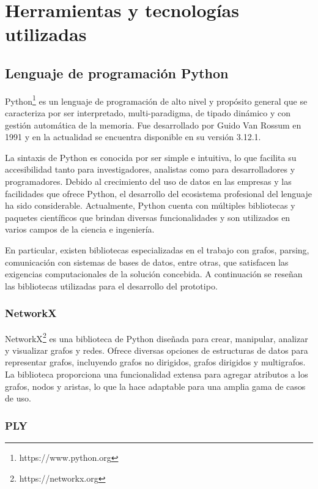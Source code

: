 \section{Herramientas y tecnologías utilizadas}\label{section:tools}

\subsection{Lenguaje de programación Python}

Python\footnote{https://www.python.org} es un lenguaje de programación de alto nivel y propósito general que se caracteriza por ser 
interpretado, multi-paradigma, de tipado dinámico y con gestión automática de la memoria. Fue desarrollado 
por Guido Van Rossum en 1991 y en la actualidad se encuentra disponible en su versión 3.12.1.

La sintaxis de Python es conocida por ser simple e intuitiva, lo que facilita su accesibilidad tanto para 
investigadores, analistas como para desarrolladores y programadores. Debido al crecimiento del uso de datos en las empresas y 
las facilidades que ofrece Python, el desarrollo del ecosistema profesional del lenguaje ha sido considerable. 
Actualmente, Python cuenta con múltiples bibliotecas y paquetes científicos que brindan diversas funcionalidades 
y son utilizados en varios campos de la ciencia e ingeniería.

En particular, existen bibliotecas especializadas en el trabajo con grafos, parsing, comunicación 
con sistemas de bases de datos, entre otras, que satisfacen las exigencias computacionales de la 
solución concebida. A continuación se reseñan las bibliotecas utilizadas para el desarrollo del prototipo.

\subsubsection{NetworkX}

NetworkX\footnote{https://networkx.org} es una biblioteca de Python diseñada para crear, manipular, analizar y visualizar 
grafos y redes. Ofrece diversas 
opciones de estructuras de datos para representar grafos, incluyendo grafos no dirigidos, grafos dirigidos y 
multigrafos. La biblioteca proporciona una funcionalidad extensa para agregar atributos a los grafos, nodos y 
aristas, lo que la hace adaptable para una amplia gama de casos de uso.

\subsubsection{PLY}

